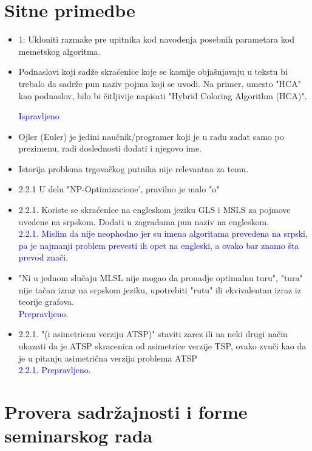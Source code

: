 \documentclass[a4paper]{report}
\newcommand{\odgovor}[1]{\textcolor{blue}{#1}}
\begin{document}
\section{Sitne primedbe}
\begin{itemize}
    \item 1: Ukloniti razmake pre upitnika kod navođenja posebnih parametara kod memetskog algoritma.
    \item Podnaslovi koji sadže skraćenice koje se kasnije objašnjavaju u tekstu bi trebalo da sadrže pun naziv pojma koji se uvodi. Na primer, umesto "HCA" kao podnaslov, bilo bi čitljivije napisati "Hybrid Coloring Algorithm (HCA)".
    
    
    \odgovor{Ispravljeno}
    \item Ojler (Euler) je jedini naučnik/programer koji je u radu zadat samo po prezimenu, radi doslednosti dodati i njegovo ime.
    \item Istorija problema trgovačkog putnika nije relevantna za temu.
    \item 2.2.1 U delu "NP-Optimizacione', pravilno je malo "o"
    \item 2.2.1. Koriste se skraćenice na engleskom jeziku GLS i MSLS za pojmove uvedene na srpskom. Dodati u zagradama pun naziv na engleskom. \\
    \odgovor{ 2.2.1. Mislim da nije neophodno jer su imena algoritama prevedena na srpski, pa je najmanji problem prevesti ih opet na engleski, a ovako bar znamo šta prevod znači.} 
    
    \item "Ni u jednom slučaju MLSL nije mogao da pronadje optimalnu turu", "tura" nije tačan izraz na srpskom jeziku, upotrebiti "rutu" ili ekvivalentan izraz iz teorije grafova.\\
    \odgovor{ Prepravljeno.}
    
    \item 2.2.1. "(i asimetricnu verziju ATSP)" staviti zarez ili na neki drugi način ukazati da je ATSP skracenica od asimetrice verzije TSP, ovako zvuči kao da je u pitanju asimetrična verzija problema ATSP \\
 \odgovor{ 2.2.1.  Prepravljeno. \\}
    
   
\end{itemize}



\section{Provera sadržajnosti i forme seminarskog rada}
\end{document}
